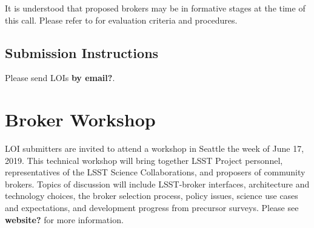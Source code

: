 \documentclass[DM,toc,lsstdraft]{lsstdoc}
\begin{document}
It is understood that proposed brokers may be in formative stages at the time of this call.
Please refer to  for evaluation criteria and procedures.

\subsection{Submission Instructions}

Please send LOIs \textbf{by email?}.

\section{Broker Workshop}


LOI submitters are invited to attend a workshop in Seattle the week of June 17, 2019.
This technical workshop will bring together LSST Project personnel, representatives of the LSST Science Collaborations, and proposers of community brokers.  
Topics of discussion will include LSST-broker interfaces, architecture and technology choices, the broker selection process, policy issues, science use cases and expectations, and development progress from precursor surveys.
Please see \textbf{website?} for more information.

%


\end{document}
